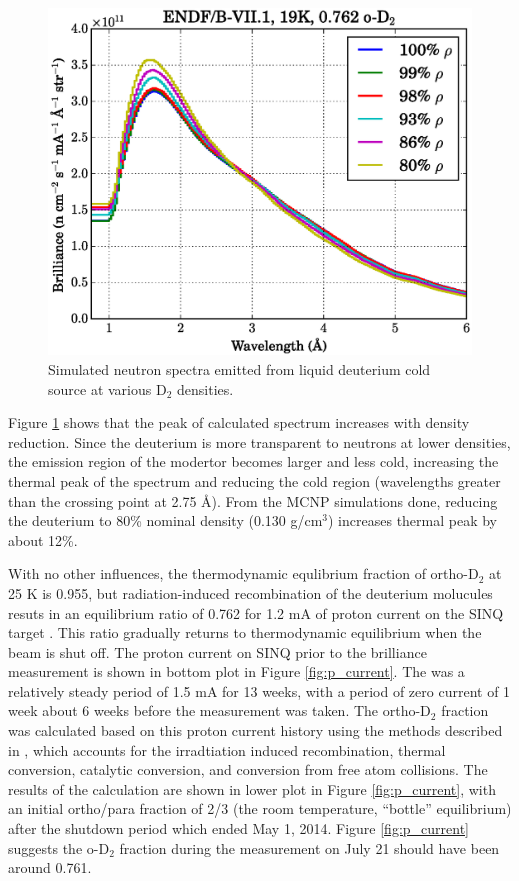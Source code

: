 \documentclass[5p,12pt]{elsarticle}
\begin{document}
\begin{figure}[h!] 
  \centering
    \includegraphics[width=\columnwidth]{graphics/density_compare.eps}
     \caption{Simulated neutron spectra emitted from liquid deuterium cold source at various D$_2$ densities. \label{fig:density_compare}}
\end{figure}

Figure \ref{fig:density_compare} shows that the peak of calculated spectrum increases with density reduction.  Since the deuterium is more transparent to neutrons at lower densities, the emission region of the modertor becomes larger and less cold, increasing the thermal peak of the spectrum and reducing the cold region (wavelengths greater than the crossing point at 2.75 {\AA}).  From the MCNP simulations done, reducing the deuterium to 80\% nominal density (0.130 g/cm$^3$) increases thermal peak by about 12\%.

With no other influences, the thermodynamic equlibrium fraction of ortho-D$_2$ at 25 K is 0.955, but radiation-induced recombination of the deuterium molucules resuts in an equilibrium ratio of 0.762 for 1.2 mA of proton current on the SINQ target \cite{op_equi}.  This ratio gradually returns to thermodynamic equilibrium when the beam is shut off.  The proton current on SINQ prior to the brilliance measurement is shown in bottom plot in Figure \ref{fig:p_current}.  The was a relatively steady period of 1.5 mA for 13 weeks, with a period of zero current of 1 week about 6 weeks before the measurement was taken.  The ortho-D$_2$ fraction was calculated based on this proton current history using the methods described in \cite{op_equi}, which accounts for the irradtiation induced recombination, thermal conversion, catalytic conversion, and conversion from free atom collisions.  The results of the calculation are shown in lower plot in Figure \ref{fig:p_current}, with an initial ortho/para fraction of 2/3 (the room temperature, ``bottle'' equilibrium) after the shutdown period which ended May 1, 2014.  Figure \ref{fig:p_current} suggests the o-D$_2$ fraction during the measurement on July 21 should have been around 0.761.
\end{document}

